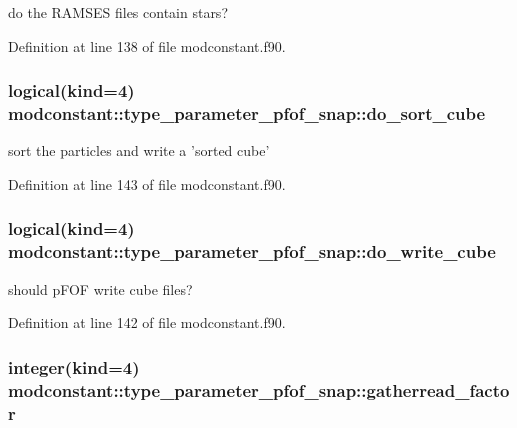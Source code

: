 do the R\-A\-M\-S\-E\-S files contain stars? 



Definition at line 138 of file modconstant.\-f90.

\hypertarget{structmodconstant_1_1type__parameter__pfof__snap_a69d97a99b9550658ab3d32d614591afd}{
\subsubsection[{do\-\_\-sort\-\_\-cube}]{\setlength{\rightskip}{0pt plus 5cm}logical(kind=4) modconstant\-::type\-\_\-parameter\-\_\-pfof\-\_\-snap\-::do\-\_\-sort\-\_\-cube}}\label{structmodconstant_1_1type__parameter__pfof__snap_a69d97a99b9550658ab3d32d614591afd}


sort the particles and write a 'sorted cube' 



Definition at line 143 of file modconstant.\-f90.

\hypertarget{structmodconstant_1_1type__parameter__pfof__snap_a3080ade093c18c757c10ee8b18b03db0}{
\subsubsection[{do\-\_\-write\-\_\-cube}]{\setlength{\rightskip}{0pt plus 5cm}logical(kind=4) modconstant\-::type\-\_\-parameter\-\_\-pfof\-\_\-snap\-::do\-\_\-write\-\_\-cube}}\label{structmodconstant_1_1type__parameter__pfof__snap_a3080ade093c18c757c10ee8b18b03db0}


should p\-F\-O\-F write cube files? 



Definition at line 142 of file modconstant.\-f90.

\hypertarget{structmodconstant_1_1type__parameter__pfof__snap_a078d7fad865fe3a66900699ea0a786da}{
\subsubsection[{gatherread\-\_\-factor}]{\setlength{\rightskip}{0pt plus 5cm}integer(kind=4) modconstant\-::type\-\_\-parameter\-\_\-pfof\-\_\-snap\-::gatherread\-\_\-factor}}\label{structmodconstant_1_1type__parameter__pfof__snap_a078d7fad865fe3a66900699ea0a786da}


